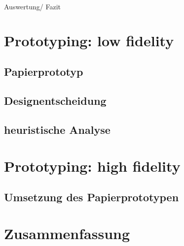 \documentclass[runningheads,a4paper]{llncs}
\begin{document}
Auswertung/ Fazit

\section{Prototyping: low fidelity}
\subsection{Papierprototyp}
\subsection{Designentscheidung}
\subsection{heuristische Analyse}

\section{Prototyping: high fidelity}
\subsection{Umsetzung des Papierprototypen}

\section{Zusammenfassung}


\newpage
 

\end{document}
